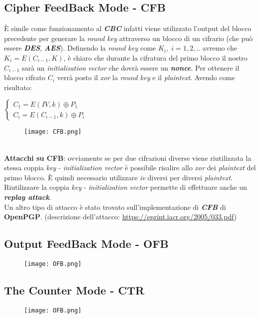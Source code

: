 \subsection{Cipher FeedBack Mode - CFB}
È simile come funzionamento al \textbf{\textit{CBC}} infatti viene utilizzato l'output del blocco precedente per generare la \textit{round key} attraverso un blocco di un cifrario (che può essere \textbf{\textit{DES}}, \textbf{\textit{AES}}). Definendo la \textit{round key} come $K_i, \; i = 1, 2, ..$ avremo che $K_i = E(C_{i - 1}, K)$, è chiaro che durante la cifratura del primo blocco il nostro $C_{i - 1}$ sarà un \textit{initialization vector} che dovrà essere un \textbf{\textit{nonce}}. Per ottenere il blocco cifrato $C_{i}$ verrà posto il \textit{xor} la \textit{round key} e il \textit{plaintext}. Avendo come risultato:
\begin{center}
    \begin{math}
        \begin{cases}
            C_1 = E(IV, k) \oplus P_1 \\
            C_i = E(C_{i - 1}, k) \oplus P_i
        \end{cases}
    \end{math}
\end{center}

\begin{figure}[h]
    \centering
    \texttt{[image: CFB.png]}
\end{figure}
\   \\
\textbf{Attacchi su CFB}: ovviamente se per due cifrazioni diverse viene riutilizzata la stessa coppia \textit{key} - \textit{initialization vector} è possibile risalire allo \textit{xor} dei \textit{plaintext} del primo blocco. È quindi necessario utilizzare \textit{iv} diversi per diversi \textit{plaintext}. Riutilizzare la coppia \textit{key} - \textit{initialization vector} permette di effettuare anche un \textbf{\textit{replay attack}}. \\
Un altro tipo di attacco è stato trovato sull'implementazione di \textbf{\textit{CFB}} di \textbf{OpenPGP}. (descrizione dell'attacco: \url{https://eprint.iacr.org/2005/033.pdf})

\newpage
\subsection{Output FeedBack Mode - OFB}

\begin{figure}[h]
    \centering
    \texttt{[image: OFB.png]}
\end{figure}



\subsection{The Counter Mode - CTR}

\begin{figure}[h]
    \centering
    \texttt{[image: OFB.png]}
\end{figure}

